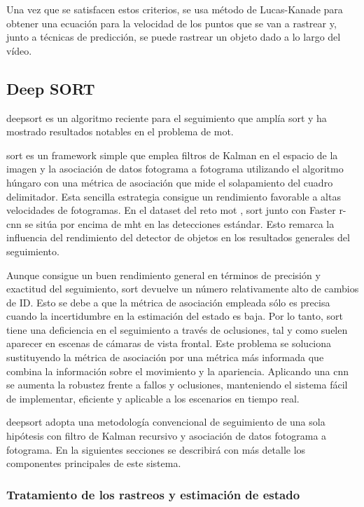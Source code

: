 Una vez que se satisfacen estos criterios, se usa método de Lucas-Kanade para obtener una ecuación para la velocidad de los puntos que se van a rastrear y, junto a técnicas de predicción, se puede rastrear un objeto dado a lo largo del vídeo.

\subsection{Deep SORT}
\label{subsec:deepsort-algorithm}

\gls{deepsort} \cite{Wojke2017simple} es un algoritmo reciente para el seguimiento que amplía \gls{sort} \cite{Bewley_2016} y ha mostrado resultados notables en el problema de \gls{mot}.

\gls{sort} es un framework simple que emplea filtros de Kalman en el espacio de la imagen y la asociación de datos fotograma a fotograma utilizando el algoritmo húngaro con una métrica de asociación que mide el solapamiento del cuadro delimitador. Esta sencilla estrategia consigue un rendimiento favorable a altas velocidades de fotogramas. En el dataset del reto \gls{mot} \cite{lealtaixe2015motchallenge}, \gls{sort} junto con Faster \gls{r-cnn} se sitúa por encima de \gls{mht} en las detecciones estándar. Esto remarca la influencia del rendimiento del detector de objetos en los resultados generales del seguimiento.

Aunque consigue un buen rendimiento general en términos de precisión y exactitud del seguimiento, \gls{sort} devuelve un número relativamente alto de cambios de ID. Esto se debe a que la métrica de asociación empleada sólo es precisa cuando la incertidumbre en la estimación del estado es baja. Por lo tanto, \gls{sort} tiene una deficiencia en el seguimiento a través de oclusiones, tal y como suelen aparecer en escenas de cámaras de vista frontal. Este problema se soluciona sustituyendo la métrica de asociación por una métrica más informada que combina la información sobre el movimiento y la apariencia. Aplicando una \gls{cnn} se aumenta la robustez frente a fallos y oclusiones, manteniendo el sistema fácil de implementar, eficiente y aplicable a los escenarios en tiempo real.

\gls{deepsort} adopta una metodología convencional de seguimiento de una sola hipótesis con filtro de Kalman recursivo y asociación de datos fotograma a fotograma. En la siguientes secciones se describirá con más detalle los componentes principales de este sistema.

\subsubsection*{Tratamiento de los rastreos y estimación de estado}
\label{subsubsec:track-handling-and-state-estimation}

